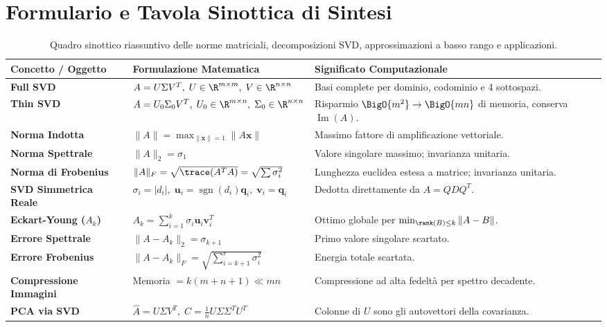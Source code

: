 \FloatBarrier
\section{Formulario e Tavola Sinottica di Sintesi}
\label{sec:formulario-svd-norme}

\begin{table}[H]
\centering
\small
\renewcommand{\arraystretch}{1.3}
\begin{tabularx}{\textwidth}{p{4.2cm} p{4.6cm} X}
\toprule
\textbf{Concetto / Oggetto} & \textbf{Formulazione Matematica} & \textbf{Significato Computazionale} \\
\midrule
\textbf{Full SVD} & $A = U \Sigma V^T, \; U \in \R^{m \times m}, \; V \in \R^{n \times n}$ & Basi complete per dominio, codominio e 4 sottospazi. \\
\textbf{Thin SVD} & $A = U_0 \Sigma_0 V^T, \; U_0 \in \R^{m \times n}, \; \Sigma_0 \in \R^{n \times n}$ & Risparmio $\BigO{m^2} \to \BigO{mn}$ di memoria, conserva $\operatorname{Im}(A)$. \\
\textbf{Norma Indotta} & $\|A\| = \max_{\|\mathbf{x}\|=1} \|A\mathbf{x}\|$ & Massimo fattore di amplificazione vettoriale. \\
\textbf{Norma Spettrale} & $\|A\|_2 = \sigma_1$ & Valore singolare massimo; invarianza unitaria. \\
\textbf{Norma di Frobenius} & $\|A\|_F = \sqrt{\trace(A^T A)} = \sqrt{\sum \sigma_i^2}$ & Lunghezza euclidea estesa a matrice; invarianza unitaria. \\
\textbf{SVD Simmetrica Reale} & $\sigma_i = |d_i|, \; \mathbf{u}_i = \operatorname{sgn}(d_i)\mathbf{q}_i, \; \mathbf{v}_i = \mathbf{q}_i$ & Dedotta direttamente da $A = Q D Q^T$. \\
\textbf{Eckart-Young ($A_k$)} & $A_k = \sum_{i=1}^k \sigma_i \mathbf{u}_i \mathbf{v}_i^T$ & Ottimo globale per $\min_{\rank(B)\le k} \|A-B\|$. \\
\textbf{Errore Spettrale} & $\|A - A_k\|_2 = \sigma_{k+1}$ & Primo valore singolare scartato. \\
\textbf{Errore Frobenius} & $\|A - A_k\|_F = \sqrt{\sum_{i=k+1}^r \sigma_i^2}$ & Energia totale scartata. \\
\textbf{Compressione Immagini} & Memoria $= k(m + n + 1) \ll mn$ & Compressione ad alta fedelt\`a per spettro decadente. \\
\textbf{PCA via SVD} & $\widehat{A} = U \Sigma V^T, \; C = \frac{1}{n} U \Sigma \Sigma^T U^T$ & Colonne di $U$ sono gli autovettori della covarianza. \\
\bottomrule
\end{tabularx}
\caption{Quadro sinottico riassuntivo delle norme matriciali, decomposizioni SVD, approssimazioni a basso rango e applicazioni.}
\label{tab:formulario-svd-norme-applicazioni}
\end{table}
